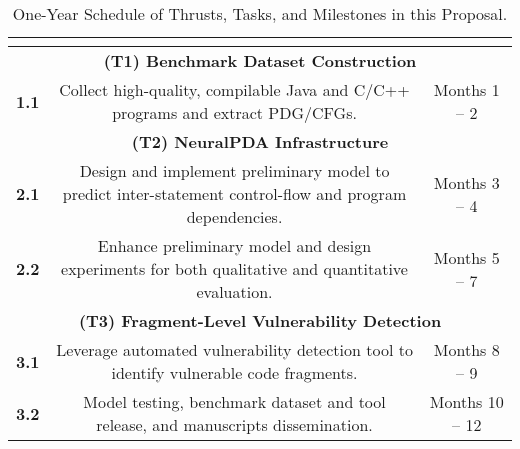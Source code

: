 \begin{table}[ht]
\centering
\begin{tabular}{|ccc|}
\hline
\multicolumn{3}{|c|}{\cellcolor[HTML]{343434}{\color[HTML]{FFFFFF} \textbf{Project Milestones \& Deliverables}}}                                                                     \\ \hline\hline
\multicolumn{3}{|c|}{\textbf{(T1) Benchmark Dataset Construction}}                                                                                                                    \\ \hline
\multicolumn{1}{|p{1cm}|}{\centering\textbf{1.1}} & \multicolumn{1}{p{10cm}|}{Collect high-quality, compilable Java and C/C++ programs and extract PDG/CFGs.}                           & \multicolumn{1}{p{3cm}|}{\centering Months 1 -- 2}   \\ \hline\hline
\multicolumn{3}{|c|}{\textbf{(T2) NeuralPDA Infrastructure}}                                                                                                                          \\ \hline
\multicolumn{1}{|p{1cm}|}{\centering\textbf{2.1}} & \multicolumn{1}{p{10cm}|}{Design and implement preliminary model to predict inter-statement control-flow and program dependencies.} & \multicolumn{1}{p{3cm}|}{\centering Months 3 -- 4}   \\
\multicolumn{1}{|p{1cm}|}{\centering\textbf{2.2}} & \multicolumn{1}{p{10cm}|}{Enhance preliminary model and design experiments for both qualitative and quantitative evaluation.}       & \multicolumn{1}{p{3cm}|}{\centering Months 5 -- 7}   \\ \hline\hline
\multicolumn{3}{|c|}{\textbf{(T3) Fragment-Level Vulnerability Detection}}                                                                                                            \\ \hline
\multicolumn{1}{|p{1cm}|}{\centering\textbf{3.1}} & \multicolumn{1}{p{10cm}|}{Leverage automated vulnerability detection tool to identify vulnerable code fragments.}                   & \multicolumn{1}{p{3cm}|}{\centering Months 8 -- 9}   \\
\multicolumn{1}{|p{1cm}|}{\centering\textbf{3.2}} & \multicolumn{1}{p{10cm}|}{Model testing, benchmark dataset and tool release, and manuscripts dissemination.}                        & \multicolumn{1}{p{3cm}|}{\centering Months 10 -- 12} \\ \hline
\end{tabular}
\caption{One-Year Schedule of Thrusts, Tasks, and Milestones in this Proposal.}
\label{tab:milestones}
\end{table}